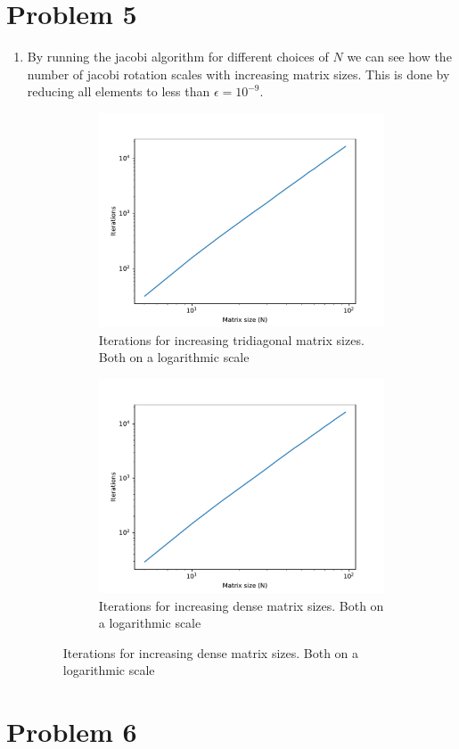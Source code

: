 \documentclass[english,notitlepage]{revtex4-1}  %
\begin{document}
\section*{Problem 5}
\begin{enumerate}[label=\alph*)]
  \item By running the jacobi algorithm for different choices of $N$ we can see how the number of jacobi rotation scales with increasing matrix sizes. This is done by reducing all elements to less than $\epsilon = 10^{-9}$.
  \begin{figure}[H]
    \begin{subfigure}{.5 \textwidth}
      \centering
      \includegraphics[width=\textwidth]{../figures/N_iter_log.pdf}
      \caption{Iterations for increasing tridiagonal matrix sizes. Both on a logarithmic scale}
      \label{fig:N_iter_log}
    \end{subfigure}
    \begin{subfigure}{.5 \textwidth}
      \centering
      \includegraphics[width=\textwidth]{../figures/N_iter_log_dense.pdf}
      \caption{Iterations for increasing dense matrix sizes. Both on a logarithmic scale}
      \label{fig:N_iter_log_dense}
    \end{subfigure}
  \end{figure}
\end{enumerate}

\section*{Problem 6}
\end{document}
